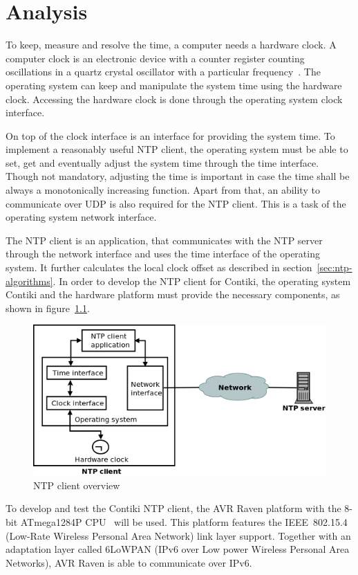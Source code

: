 
\chapter{Analysis}
To keep, measure and resolve the time, a computer needs a hardware clock.
A computer clock is an electronic device with a counter register counting oscillations in a
quartz crystal oscillator with a particular frequency~\cite{thesis-sync}.
The operating system can keep and manipulate the system time using the hardware clock.
Accessing the hardware clock is done through the operating system clock interface.

On top of the clock interface is an interface for providing the system time.
To implement a reasonably useful NTP client,
the operating system must be able to set, get and eventually adjust the system time
through the time interface.
Though not mandatory, adjusting the time is important
in case the time shall be always a monotonically increasing function.
Apart from that, an ability to communicate over UDP is also required for the NTP client.
This is a task of the operating system network interface.

The NTP client is an application, that communicates with the NTP server through the network interface
and uses the time interface of the operating system.
It further calculates the local clock offset as described in section~\ref{sec:ntp-algorithms}.
In order to develop the NTP client for Contiki,
the operating system Contiki and the hardware platform must provide the necessary
components, as shown in figure~\ref{fig:analysis-overview}.
\begin{figure}
  \centering
  \includegraphics[width=13cm,keepaspectratio]{fig/analysis.png}
  \caption{NTP client overview}
  \label{fig:analysis-overview}
\end{figure}

To develop and test the Contiki NTP client,
the AVR Raven platform with the 8-bit ATmega1284P CPU~\cite{avr-datasheet} will be used.
This platform features the IEEE~802.15.4 (Low-Rate Wireless Personal Area Network) link layer support.
Together with an adaptation layer called 6LoWPAN (IPv6 over Low power Wireless Personal Area Networks),
AVR Raven is able to communicate over IPv6.








